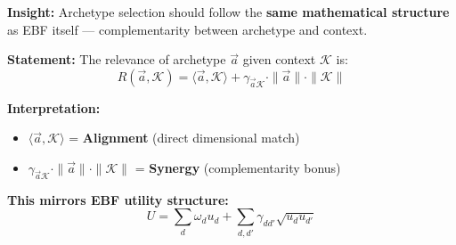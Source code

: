 \begin{tcolorbox}[colback=blue!5!white, colframe=blue!75!black,
    title=\textbf{Theorem HHH-T9: Archetype-Context Complementarity}]

\textbf{Insight:} Archetype selection should follow the \textbf{same mathematical structure} as EBF itself --- complementarity between archetype and context.

\textbf{Statement:} The relevance of archetype $\vec{a}$ given context $\mathcal{K}$ is:
\begin{equation}
\boxed{R(\vec{a}, \mathcal{K}) = \langle \vec{a}, \mathcal{K} \rangle + \gamma_{\vec{a}\mathcal{K}} \cdot \|\vec{a}\| \cdot \|\mathcal{K}\|}
\label{eq:hhh-relevance-elegant}
\end{equation}

\textbf{Interpretation:}
\begin{itemize}[nosep]
    \item $\langle \vec{a}, \mathcal{K} \rangle$ = \textbf{Alignment} (direct dimensional match)
    \item $\gamma_{\vec{a}\mathcal{K}} \cdot \|\vec{a}\| \cdot \|\mathcal{K}\|$ = \textbf{Synergy} (complementarity bonus)
\end{itemize}

\textbf{This mirrors EBF utility structure:}
\begin{equation}
U = \sum_d \omega_d u_d + \sum_{d,d'} \gamma_{dd'} \sqrt{u_d u_{d'}}
\end{equation}

\end{tcolorbox}

